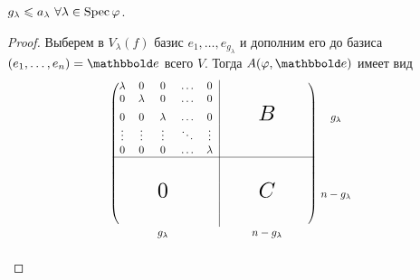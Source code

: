 \begin{comment}
    $a_\lambda \geq 1$, $g_\lambda \geq 1 \ \forall \lambda \in \spec \phi$.
\end{comment}

\begin{proposal}
    $g_\lambda \leqslant a_\lambda \ \forall \lambda \in \operatorname{\mathop{\mathrm{Spec}}} \varphi$.
\end{proposal}

\begin{proof}
    Выберем в $V_\lambda(f)$ базис $e_1, \dots, e_{g_\lambda}$ и дополним его до базиса $(e_1, \dots, e_n) = \E$ всего $V$. Тогда $A(\phi, \E)$ имеет вид
    \begin{equation*}
        \resizebox{7cm}{!}{
            \begin{math}
                \begin{blockarray}{ccccccccccc}
                    \begin{block}{(ccccc|ccccc)c}
                        \lambda & 0 & 0 & \dots & 0 & & & & & \\
                        0 & \lambda & 0 & \dots & 0 & & & & & \\
                        0 & 0 & \lambda & \dots & 0 & & & \scaleobj{2}{B} & & & g_{\lambda}\\
                        \vdots & \vdots & \vdots & \ddots & \vdots & & \\
                        0 & 0 & 0 & \dots & \lambda & & \\
                        \cline{1-10}
                        & & & & & & & & & & \\
                        & & & & & & & & & & \\
                        & & \scaleobj{2}{0} & & & & & \scaleobj{2}{C} & & & n - g_{\lambda} \\
                        & & & & & & & & & & \\
                        & & & & & & & & & & \\
                    \end{block}
                    & & g_{\lambda} & & & & & n - g_{\lambda}            
                \end{blockarray}
            \end{math}
        }
    \end{equation*}


\end{proof}
